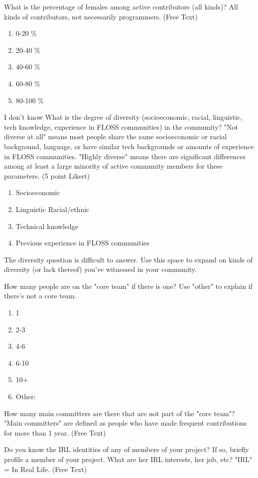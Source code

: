 \begin{table}
What is the percentage of females among active contributors (all kinds)? All kinds of contributors, not necessarily programmers. (Free Text)

\begin{enumerate}
\item  0-20 \%
\item 20-40 \%
\item 40-60 \%
\item 60-80 \%
\item 80-100 \%
\end{enumerate}

I don't know What is the degree of diversity (socioeconomic, racial, linguistic, tech knowledge, experience in FLOSS communities) in the community? "Not diverse at all" means most people share the same socioeconomic or racial background, language, or have similar tech backgrounds or amounts of experience in FLOSS communities. "Highly diverse" means there are significant differences among at least a large minority of active community members for these parameters. (5 point Likert)

\begin{enumerate}
\item Socioeconomic
\item Linguistic Racial/ethnic
\item Technical knowledge
\item Previous experience in FLOSS communities
\end{enumerate}

The diversity question is difficult to answer. Use this space to expand on kinds of diversity (or lack thereof) you've witnessed in your community.

How many people are on the "core team" if there is one? Use "other" to explain if there's not a core team.
\begin{enumerate}
\item 1
\item 2-3
\item 4-6
\item 6-10
\item 10+
\item Other:
\end{enumerate}

How many main committers are there that are not part of the "core team"? "Main committers" are defined as people who have made frequent contributions for more than 1 year. (Free Text)

Do you know the IRL identities of any of members of your project? If so, briefly profile a member of your project. What are her IRL interests, her job, etc? "IRL" = In Real Life. (Free Text)


\end{table}
